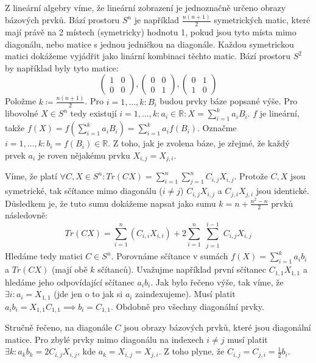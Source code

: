 \documentclass[12pt, a4paper]{article}
\begin{document}
\section{}
Z lineární algebry víme, že lineární zobrazení je jednoznačně určeno obrazy bázových prvků. Bází prostoru $S^n$ je například $\frac{n(n+1)}{2}$ symetrických matic, které mají právě na 2 místech (symetricky) hodnotu 1, pokud jsou tyto místa mimo diagonálu, nebo matice s jednou jedničkou na diagonále. Každou symetrickou matici dokážeme vyjádřit jako linární kombinaci těchto matic. Bází prostoru $S^2$ by například byly tyto matice:
\[
\begin{pmatrix}
1 & 0\\
0 & 0
\end{pmatrix}, 
\begin{pmatrix}
0 & 0\\
0 & 1
\end{pmatrix},
\begin{pmatrix}
0 & 1\\
1 & 0
\end{pmatrix}
\]
Položme $k \coloneqq \frac{n(n+1)}{2}$. Pro $i=1,\dots,k: B_i$ budou prvky báze popsané výše. Pro libovolné $X \in S^n$ tedy existují $i=1,\dots,k: a_i \in \mathbb{R}: X = \sum_{i=1}^k a_iB_i$. $f$ je lineární, takže $f(X)=f(\sum_{i=1}^k a_iB_i)=\sum_{i=1}^k a_if(B_i)$. Označme $i=1,\dots,k: b_i = f(B_i) \in \mathbb{R}$. Z toho, jak je zvolena báze, je zřejmé, že každý prvek $a_i$ je roven nějakému prvku $X_{i,j}=X_{j,i}$.


Víme, že platí $\forall C,X \in S^n: Tr(CX)= \sum_{i=1}^{n} \sum_{j=1}^{n} C_{i,j}X_{i,j}$. Protože $C,X$ jsou symetrické, tak sčítance mimo diagonálu ($i\neq j$) $C_{i,j}X_{i,j}$ a $C_{j,i}X_{j,i}$ jsou identické. Důsledkem je, že tuto sumu dokážeme napsat jako sumu $k=n+\frac{n^2-n}{2}$ prvků následovně:
\[
Tr(CX)=\sum_{i=1}^n(C_{i,i}X_{i,i})+2\sum_{i=1}^{n} \sum_{\substack{j=1}}^{i-1} C_{i,j}X_{i,j}
\]
Hledáme tedy matici $C \in S^n$. Porovnáme sčítance v sumách $f(X)=\sum_{i=1}^k a_ib_i$ a $Tr(CX)$ (mají obě $k$ sčítanců). Uvažujme například první sčítanec $C_{1,1}X_{1,1}$ a hledáme jeho odpovídající sčítanec $a_ib_i$. Jak bylo řečeno výše, tak víme, že $\exists i: a_i = X_{1,1}$ (jde jen o to jak si $a_i$ zaindexujeme). Musí platit $a_ib_i = X_{1,1}C_{1,1} \implies b_i = C_{1,1}$. Obdobně pro všechny diagonální prvky. 

Stručně řečeno, na diagonále $C$ jsou obrazy bázových prvků, které jsou diagonální matice. Pro zbylé prvky mimo diagonálu na indexech $i\neq j$ musí platit $\exists k: a_kb_k = 2C_{i,j}X_{i,j}$, kde $a_k = X_{i,j}=X_{j,i}$. Z toho plyne, že $C_{i,j}=C_{j,i}=\frac{1}{2}b_i$.
\end{document}
